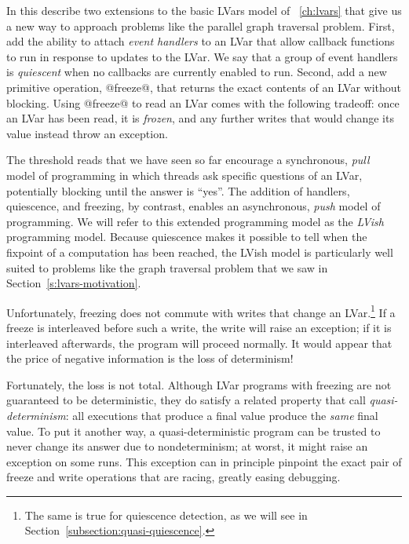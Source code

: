 In this  describe two extensions to the basic LVars model
of ~\ref{ch:lvars} that give us a new way to approach problems like
the parallel graph traversal problem.
First,  add the ability to attach \emph{event handlers} to an LVar
that allow callback functions to run in response to updates to
the LVar.  We say that a group of event handlers is \emph{quiescent} when no callbacks
are currently enabled to run.  Second,  add a new primitive
operation, @freeze@, that returns the exact contents of an LVar
without blocking.  Using @freeze@ to read an LVar comes with the
following tradeoff: once an LVar has been read, it is \emph{frozen},
and any further writes that would change its value instead throw an
exception.

The threshold reads that we have seen so far encourage a
synchronous, \emph{pull} model of programming in which threads ask
specific questions of an LVar, potentially blocking until the answer
is ``yes''.  The addition of handlers, quiescence, and freezing, by contrast, enables
an asynchronous, \emph{push} model of programming.  We will refer to
this extended programming model as the \emph{LVish} programming model.  Because quiescence
makes it possible to tell when the fixpoint of a computation has been
reached, the LVish model is particularly well suited to problems like
the graph traversal problem that we saw in
Section~\ref{s:lvars-motivation}.

Unfortunately, freezing does not commute with writes that change an
LVar.\footnote{The same is true for quiescence detection, as we will see in
Section~\ref{subsection:quasi-quiescence}.}  If a freeze is
interleaved before such a write, the write will raise an exception; if
it is interleaved afterwards, the program will proceed normally.  It
would appear that the price of negative information is the loss of
determinism!

Fortunately, the loss is not total.  Although LVar programs with
freezing are not guaranteed to be deterministic, they do satisfy a
related property that  call \emph{quasi-determinism}: all executions
that produce a final value produce the \emph{same} final value.  To
put it another way, a quasi-deterministic program can be trusted to
never change its answer due to nondeterminism; at worst, it might
raise an exception on some runs.  This exception can in principle
pinpoint the exact pair of freeze and write operations that are
racing, greatly easing debugging.

